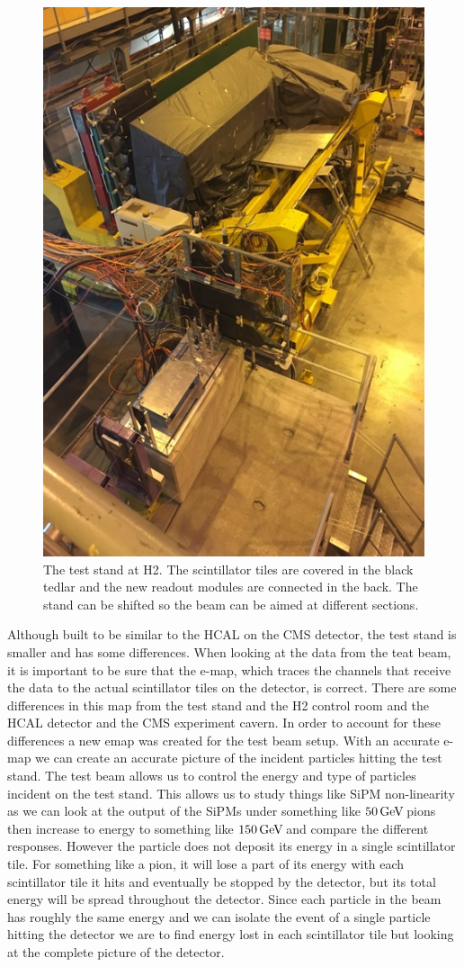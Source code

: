 \begin{figure}
\centering
\includegraphics[width=0.6\linewidth]{Figures/Teststand.png}
\caption{The test stand at H2. The scintillator tiles are covered in the black tedlar and the new readout modules are connected in the back. The stand can be shifted so the beam can be aimed at different sections.}
\label{fig:stand}
\end{figure}

Although built to be similar to the HCAL on the CMS detector, the test stand is smaller and has some differences. When looking at the data from the teat beam, it is important to be sure that the e-map, which traces the channels that receive the data to the actual scintillator tiles on the detector, is correct. There are some differences in this map from the test stand and the H2 control room and the HCAL detector and the CMS experiment cavern. In order to account for these differences a new emap was created for the test beam setup. With an accurate e-map we can create an accurate picture of the incident particles hitting the test stand. The test beam allows us to control the energy and type of particles incident on the test stand. This allows us to study things like SiPM non-linearity as we can look at the output of the SiPMs under something like $50 {\,\text{Ge\hspace{-.08em}V\hspace{-0.16em}}}$ pions then increase to energy to something like $150 {\,\text{Ge\hspace{-.08em}V\hspace{-0.16em}}}$ and compare the different responses. However the particle does not deposit its energy in a single scintillator tile. For something like a pion, it will lose a part of its energy with each scintillator tile it hits and eventually be stopped by the detector, but its total energy will be spread throughout the detector. Since each particle in the beam has roughly the same energy and we can isolate the event of a single particle hitting the detector we are to find energy lost in each scintillator tile but looking at the complete picture of the detector. 

